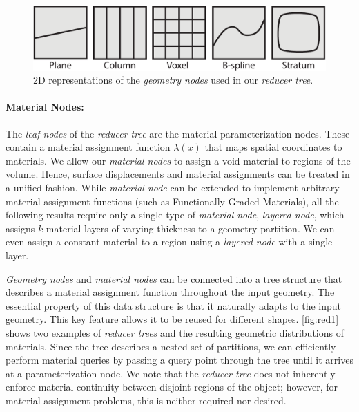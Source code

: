 \begin{figure}
\includegraphics[width=0.7\linewidth]{figure/geometryNodes}
\caption{2D representations  of the \emph{geometry nodes} used in our \emph{reducer tree}.}
\label{fig:geometryNodes}
\end{figure}

\paragraph{Material Nodes:} The \emph{leaf nodes} of the \emph{reducer tree} are the material parameterization nodes. These contain a material assignment function $\lambda\left(x\right)$ that maps spatial coordinates to materials. We allow our \emph{material nodes} to assign a void material to regions of the volume. Hence, surface displacements and material assignments can be treated in a unified fashion.
While \emph{material node} can be extended to implement arbitrary material assignment functions (such as Functionally Graded Materials), all the following results require only a single type of \emph{material node}, \emph{layered node}, which assigns $k$ material layers of varying thickness to a geometry partition. We can even assign a constant material to a region using a \emph{layered node} with a single layer. 

\emph{Geometry nodes} and \emph{material nodes} can be connected into a tree structure that describes a material assignment function throughout the input geometry. 
The essential property of this data structure is that it naturally adapts to the input geometry. This key feature allows it to be reused for different shapes.
\autoref{fig:red1} shows two examples of \emph{reducer trees} and the resulting geometric distributions of materials.
Since the tree describes a nested set of partitions, we can efficiently perform material queries by passing a query point through the tree until it arrives at a parameterization node. 
We note that the \emph{reducer tree} does not inherently enforce material continuity between disjoint regions of the object; however, for material assignment problems, this is neither required nor desired. 

